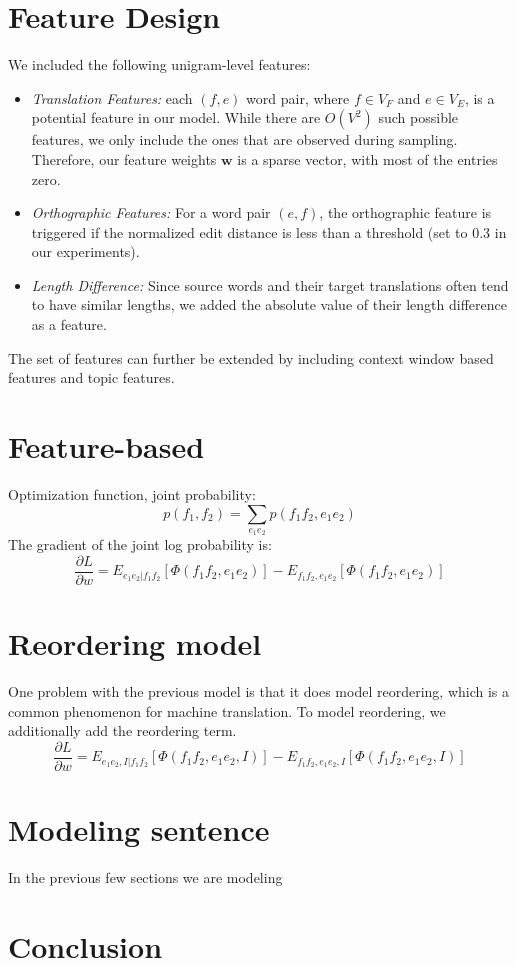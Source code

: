 \section{Feature Design}
\label{sec:feature}
We included the following unigram-level features:
\begin{itemize}
\item \emph{Translation Features:} each $(f, e)$ word pair, where $f  \in V_F $ and $e \in V_E$, is a potential feature in our model. While there are $O(V^2)$ such possible features, we only include the ones that are observed during sampling. 
Therefore, our feature weights $\mathbf{w}$ is a sparse vector, with most of the entries zero.
\item \emph{Orthographic Features:} 
For a word pair $(e, f)$, the orthographic feature is triggered if the normalized edit distance is less than a threshold (set to 0.3 in our experiments).
\item \emph{Length Difference:} Since source words and their target translations often tend to have similar lengths, we added the absolute value of their length difference as a feature. 
\end{itemize}
The set of features can further be extended by including context window based features and topic features.
\section{Feature-based}
Optimization function, joint probability:
$$p(f_1,f_2) = \sum_{e_1e_2}p(f_1f_2,e_1e_2)$$
The gradient of the joint log probability is:
$$\frac{\partial L}{\partial w} = E_{e_1e_2|f_1f_2}[\Phi(f_1f_2,e_1e_2)] - E_{f_1f_2,e_1e_2}[\Phi(f_1f_2,e_1e_2)]$$
\section{Reordering model}
One problem with the previous model is that it does model reordering, which is a common phenomenon for machine translation. To model reordering, we additionally add the reordering term.
$$\frac{\partial L}{\partial w} = E_{e_1e_2, I|f_1f_2}[\Phi(f_1f_2,e_1e_2, I)] - E_{f_1f_2,e_1e_2, I}[\Phi(f_1f_2,e_1e_2,I)]$$
\section{Modeling sentence}
In the previous few sections we are modeling 
\section{Conclusion}
